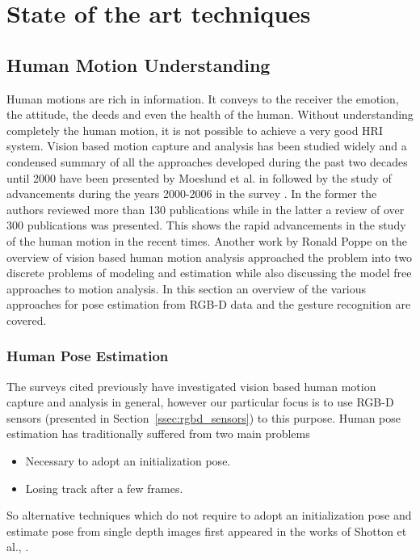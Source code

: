 \chapter{State of the art techniques}

\label{Chapter3} %


\section{Human Motion Understanding} %
 Human motions are rich in information. It conveys to the receiver the emotion, the attitude, the deeds and even the health of the human. Without understanding completely the human motion, it is not possible to achieve a very good HRI system.  Vision based motion capture and analysis has been studied widely and a condensed summary of all the approaches developed during the past two decades until 2000 have been presented by Moeslund et al. in \cite{Moeslund2001231} followed by the study of advancements during the years 2000-2006 in the survey \cite{Moeslund200690}. In the former the authors reviewed more than 130 publications while in the latter a review of over 300 publications was presented. This shows the rapid advancements in the study of the human motion in the recent times. Another work by Ronald Poppe \cite{Poppe20074} on the overview of vision based human motion analysis approached the problem into two discrete problems of modeling and estimation while also discussing the model free approaches to motion analysis. In this section an overview of the various approaches for pose estimation from RGB-D data and the gesture recognition are covered.
\subsection{Human Pose Estimation}
\label{sec:humanpose}
The surveys \cite{Moeslund2001231}\cite{Moeslund200690}\cite{Poppe20074} cited previously have investigated vision based human motion capture and analysis in general, however our particular focus is to use RGB-D sensors (presented in Section~\ref{ssec:rgbd_sensors}) to this purpose. Human pose estimation has traditionally suffered from two main problems
\begin{itemize}
\item Necessary to adopt an initialization pose.
\item Losing track after a few frames.
\end{itemize}
So alternative techniques which do not require to adopt an initialization pose and estimate pose from single depth images first appeared in the works of Shotton et al., \cite{shotton2013real}.
